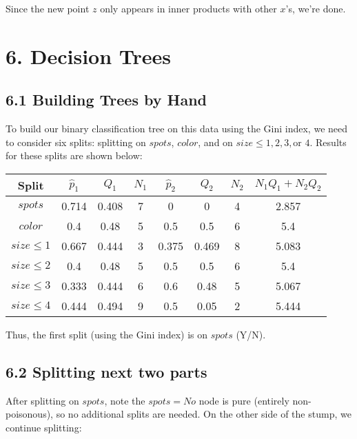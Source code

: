 \documentclass[paper=a4, fontsize=11pt]{scrartcl} %
\numberwithin{equation}{section} %
\numberwithin{figure}{section} %
\numberwithin{table}{section} %
\begin{document}
Since the new point $z$ only appears in inner products with other $x$'s, we're done.


\section*{6. Decision Trees}
\subsection*{6.1 Building Trees by Hand}

To build our binary classification tree on this data using the Gini index, we need to consider six splits: splitting on $spots$, $color$, and on $size \leq 1, 2, 3, \textrm{or } 4$. Results for these splits are shown below: \\

\begin{center}
\begin{tabular}{| c | c | c | c | c | c | c | c |}
\hline
	\textbf{Split} & $\hat{p}_1$ & $Q_1$ & $N_1$ & $\hat{p}_2$ & $Q_2$ & $N_2$ & $N_1Q_1 + N_2Q_2$ \\
\hline
	$spots$ & 0.714 & 0.408 & 7 & 0 & 0 & 4 & 2.857 \\ \hline
	$color$ & 0.4 & 0.48 & 5 & 0.5 & 0.5 & 6 & 5.4 \\ \hline
	$size \leq 1$ & 0.667 & 0.444 & 3 & 0.375 & 0.469 & 8 & 5.083 \\ \hline
	$size \leq 2$ & 0.4 & 0.48 & 5 & 0.5 & 0.5 & 6 & 5.4 \\ \hline
	$size \leq 3$ & 0.333 & 0.444 & 6 & 0.6 & 0.48 & 5 & 5.067 \\ \hline
	$size \leq 4$ & 0.444 & 0.494 & 9 & 0.5 & 0.05 & 2 & 5.444 \\ \hline
\end{tabular}
\end{center}

Thus, the first split (using the Gini index) is on $spots$ (Y/N).

\subsection*{6.2 Splitting next two parts}

After splitting on $spots$, note the $spots = No$ node is pure (entirely non-poisonous), so no additional splits are needed. On the other side of the stump, we continue splitting:
\end{document}
